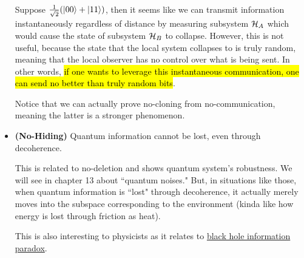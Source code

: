 \documentclass[12pt]{article}
\begin{document}
\begin{itemize}
    \begin{example}
        Suppose $\frac{1}{\sqrt{2}}(\Ket{00} + \Ket{11})$, then it seems like we can transmit information instantaneously regardless of distance by measuring subsystem $\HHH_A$ which would cause the state of subsystem $\HHH_B$ to collapse. However, this is not useful, because the state that the local system collapses to is truly random, meaning that the local observer has no control over what is being sent. In other words, \hl{if one wants to leverage this instantaneous communication, one can send no better than truly random bits}.
    \end{example}

    \begin{remark}
        Notice that we can actually prove no-cloning from no-communication, meaning the latter is a stronger phenomenon.
    \end{remark}
    \item \textbf{(No-Hiding)} Quantum information cannot be lost, even through decoherence.

    This is related to no-deletion and shows quantum system's robustness. We will see in chapter 13 about ``quantum noises." But, in situations like those, when quantum information is ``lost" through decoherence, it actually merely moves into the subspace corresponding to the environment (kinda like how energy is lost through friction as heat).

    This is also interesting to physicists as it relates to \href{https://en.wikipedia.org/wiki/Black_hole_information_paradox}{black hole information paradox}.
\end{itemize}
\end{document}

